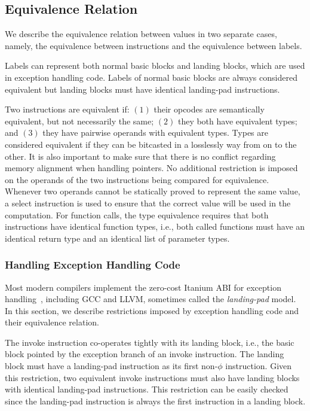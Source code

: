 \subsection{Equivalence Relation}

We describe the equivalence relation between values in two
separate cases, namely, the equivalence between instructions and the
equivalence between labels.

Labels can represent both normal basic blocks and landing blocks, which are used
in exception handling code.
Labels of normal basic blocks are always considered equivalent but
landing blocks must have identical landing-pad instructions.

Two instructions are equivalent if: $(1)$ their opcodes are semantically
equivalent, but not necessarily the same; $(2)$ they both have equivalent types;
and $(3)$ they have pairwise operands with equivalent types.
Types are considered equivalent if they can be bitcasted in a losslessly way
from on to the other.
It is also important to make sure that there is no conflict regarding memory
alignment when handling pointers.
No additional restriction is imposed on the operands of the two instructions
being compared for equivalence.
Whenever two operands cannot be statically proved to represent the same value,
a select instruction is used to ensure that the correct value will be used in
the computation.
For function calls, the type equivalence requires that both instructions have
identical function types, i.e., both called functions must have an identical
return type and an identical list of parameter types. 

\subsubsection{Handling Exception Handling Code}

Most modern compilers implement the zero-cost Itanium ABI for exception
handling~\cite{dinechin00}, including GCC and LLVM, sometimes called the
\textit{landing-pad} model. In this section, we describe restrictions imposed
by exception handling code and their equivalence relation.

The invoke instruction co-operates tightly with its landing block, i.e., the
basic block pointed by the exception branch of an invoke instruction.
The landing block must have a landing-pad instruction as its first non-$\phi$
instruction.
Given this restriction, two equivalent invoke instructions must also have
landing blocks with identical landing-pad instructions.
This restriction can be easily checked since the landing-pad instruction is
always the first instruction in a landing block. 

